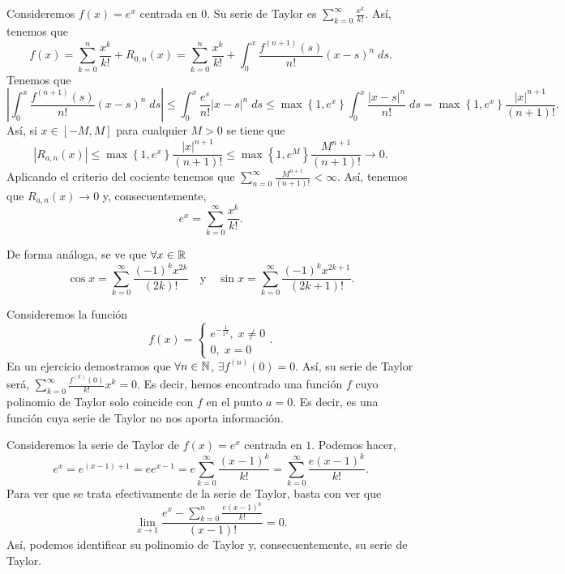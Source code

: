 \begin{eg}
\normalfont Consideremos $\displaystyle f\left(x\right)= e^{x} $ centrada en 0. Su serie de Taylor es $\displaystyle \sum^{\infty}_{k=0}\frac{x^{k}}{k!} $. Así, tenemos que
\[f\left(x\right) = \sum^{n}_{k=0}\frac{x^{k}}{k!}+R_{0,n}\left(x\right) = \sum^{n}_{k=0}\frac{x^{k}}{k!}+\int^{x}_{0} \frac{f^{\left(n+1\right)}\left(s\right)}{n!}\left(x-s\right)^{n} \; d s .\]
Tenemos que 
\[ \left|\int^{x}_{0} \frac{f^{\left(n+1\right)}\left(s\right)}{n!}\left(x-s\right)^{n} \; d s\right| \leq \int^{x}_{0} \frac{e^{s}}{n!} \left|x-s\right|^{n} \; d s \leq \max \left\{ 1,e^{x}\right\} \int^{x}_{0} \frac{ \left|x-s\right|^{n}}{n!} \; d s = \max \left\{ 1,e^{x}\right\} \frac{ \left|x\right|^{n+1}}{\left(n+1\right)!} .\]
Así, si $\displaystyle x \in \left[-M,M\right]  $ para cualquier $\displaystyle M > 0 $ se tiene que
\[ \left|R_{a,n}\left(x\right)\right| \leq \max \left\{ 1,e^{x}\right\} \frac{ \left|x\right|^{n+1}}{\left(n+1\right)!} \leq \max \left\{ 1,e^{M}\right\} \frac{M^{n+1}}{\left(n+1\right)!} \to 0 .\]
 Aplicando el criterio del cociente tenemos que $\displaystyle \sum^{\infty}_{n=0}\frac{M^{n+1}}{\left(n+1\right)!} < \infty $. Así, tenemos que $\displaystyle R_{a,n}\left(x\right) \to 0 $ y, consecuentemente, 
\[e^{x} = \sum^{\infty}_{k=0}\frac{x^{k}}{k!} .\]
\end{eg}
\begin{eg}
\normalfont De forma análoga, se ve que $\displaystyle \forall x \in \mathbb{R} $ 
\[\cos x = \sum^{\infty}_{k=0}\frac{\left(-1\right)^{k}x^{2k}}{\left(2k\right)!} \quad \text{y} \quad \sin x = \sum^{\infty}_{k=0}\frac{\left(-1\right)^{k}x^{2k+1}}{\left(2k+1\right)!} .\]
\end{eg}
\begin{eg}
\normalfont Consideremos la función 
\[f\left(x\right) = 
\begin{cases}
e^{-\frac{1}{x^{2}}}, \; x \neq 0 \\
0, \; x = 0
\end{cases}
.\]
En un ejercicio demostramos que $\displaystyle \forall n \in\mathbb{N} $, $\displaystyle \exists f^{\left(n\right)}\left(0\right) = 0 $. Así, su serie de Taylor será, $\displaystyle \sum^{\infty}_{k=0}\frac{f^{\left(k\right)}\left(0\right)}{k!}x^{k} = 0 $. Es decir, hemos encontrado una función $\displaystyle f $ cuyo polinomio de Taylor solo coincide con $\displaystyle f $ en el punto $\displaystyle a = 0 $. Es decir, es una función cuya serie de Taylor no nos aporta información.
\end{eg}
\begin{eg}
\normalfont Consideremos la serie de Taylor de $\displaystyle f\left(x\right)=e^{x} $ centrada en $\displaystyle 1 $. Podemos hacer,
\[e^{x} = e^{\left(x-1\right)+1} = e e^{x-1} = e \sum^{\infty }_{k=0}\frac{\left(x-1\right)^{k}}{k!} = \sum^{\infty}_{k=0}\frac{e\left(x-1\right)^{k}}{k!} .\]
Para ver que se trata efectivamente de la serie de Taylor, basta con ver que 
\[\lim_{x \to 1}\frac{e^{x}-\sum^{n}_{k=0}\frac{e\left(x-1\right)^{k}}{k!}}{\left(x-1\right)!} = 0 .\]
Así, podemos identificar su polinomio de Taylor y, consecuentemente, su serie de Taylor.
\end{eg}
